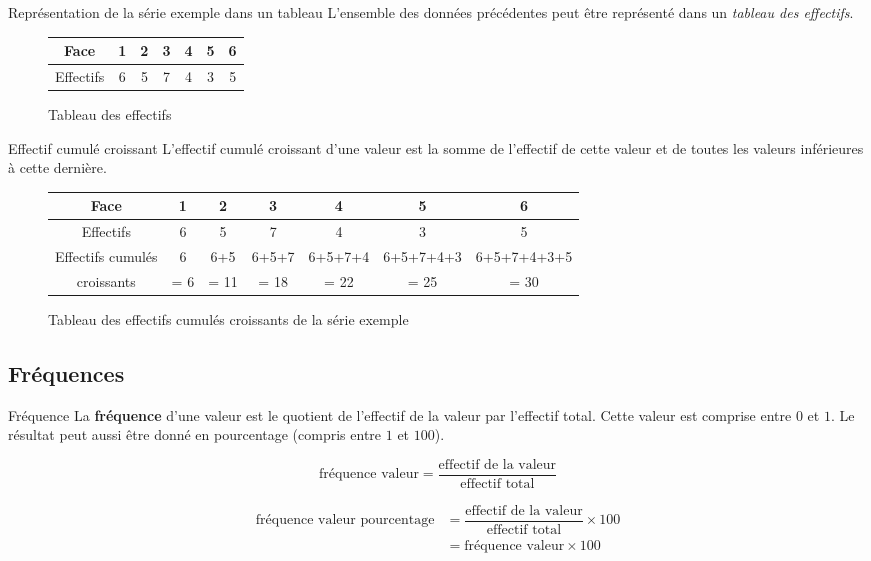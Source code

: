 \documentclass[titre=Stastistiques, classe=Troisième]{jeanmonnet}
\begin{document}
\begin{exemple}{Représentation de la série exemple dans un tableau}{}
L'ensemble des données précédentes peut être représenté dans un \emph{tableau des effectifs}.

\begin{figure}[H]
\begin{center}
	\begin{tabular}{|*{7}{c|}}
		\hline
		Face & 1 & 2 & 3 & 4 & 5 & 6 \\
		\hline
		Effectifs & 6&5&7&4&3&5\\
		\hline
	\end{tabular}
\end{center}
\caption{Tableau des effectifs}
\end{figure}
\end{exemple}

\begin{definition}{Effectif cumulé croissant}{}
	L'effectif cumulé croissant d'une valeur est la somme de l'effectif de cette valeur et de toutes les valeurs inférieures à cette dernière.	
\end{definition}


\begin{figure}[H]
\begin{center}
	\begin{tabular}{|*{7}{c|}}
		\hline
		Face & 1 & 2 & 3 & 4 & 5 & 6 \\
		\hline
		Effectifs & 6&5&7&4&3&5\\
		\hline
		Effectifs cumulés& 6 & 6+5 & 6+5+7 & 6+5+7+4 & 6+5+7+4+3 & 6+5+7+4+3+5\\
		croissants & = 6 & = 11 & = 18 & = 22 & = 25 & = 30\\
		\hline
	\end{tabular}
\end{center}
\caption{Tableau des effectifs cumulés croissants de la série exemple}
\end{figure}	

\subsection{Fréquences}

\begin{definition}{Fréquence}{}
	La \textbf{fréquence} d'une valeur est le quotient de l'effectif de la valeur par l'effectif total. Cette valeur est comprise entre $0$ et $1$. Le résultat peut aussi être donné en pourcentage (compris entre $1$ et $100$).
	
	\[\mbox{fréquence valeur} = \dfrac{\mbox{effectif de la valeur}}{\mbox{effectif total}}\]
	
	\begin{align*}
	\mbox{fréquence valeur pourcentage}
		& = \dfrac{\mbox{effectif de la valeur}}{\mbox{effectif total}} \times 100\\
		& = \mbox{fréquence valeur} \times 100
	\end{align*}
\end{definition}
\end{document}
